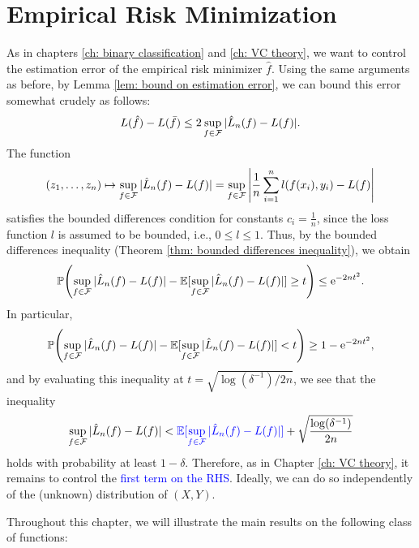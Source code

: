 \section{Empirical Risk Minimization}
\label{subsec: empirical risk minimization for general loss function}

As in chapters \ref{ch: binary classification} and \ref{ch: VC theory}, we want to control the estimation error of the empirical risk minimizer $\hat{f}$. Using the same arguments as before, by Lemma \ref{lem: bound on estimation error}, we can bound this error somewhat crudely as follows:
\[
    L(\hat{f}) - L(\bar{f}) \leq 2 \sup_{f \in \mathcal{F}} \abs*{\hat{L}_n(f) - L(f)}.
\]
The function
\[
    (z_1, \dots, z_n) \mapsto \sup_{f \in \mathcal{F}} \abs*{\hat{L}_n(f) - L(f)} = \sup_{f \in \mathcal{F}} \abs{\frac{1}{n} \sum_{i=1}^n l(f(x_i), y_i) - L(f)}
\]
satisfies the bounded differences condition for constants $c_i = \frac{1}{n}$, since the loss function $l$ is assumed to be bounded, i.e., $0 \leq l \leq 1$. Thus, by the bounded differences inequality (Theorem \ref{thm: bounded differences inequality}), we obtain
\[
    \Prob\left(\sup_{f \in \mathcal{F}} \abs*{\hat{L}_n(f) - L(f)} - \Exp[\sup_{f \in \mathcal{F}} \abs*{\hat L_n(f) - L(f)}] \geq t\right) \leq \e^{-2nt^2}.
\]
In particular,
\[
    \Prob\left(\sup_{f \in \mathcal{F}} \abs*{\hat{L}_n(f) - L(f)} - \Exp[\sup_{f \in \mathcal{F}} \abs*{\hat{L}_n(f) - L(f)}] < t\right) \geq 1 - \e^{-2nt^2},
\]
and by evaluating this inequality at $t = \sqrt{\log(\delta^{-1}) / 2n}$, we see that the inequality
\[
    \sup_{f \in \mathcal{F}} \abs*{\hat{L}_n(f) - L(f)} < {\color{blue} \Exp[\sup_{f \in \mathcal{F}} \abs*{\hat L_n(f) - L(f)}]} + \sqrt{\frac{\log(\delta^{-1})}{2n}}
\]
holds with probability at least $1 - \delta$. Therefore, as in Chapter \ref{ch: VC theory}, it remains to control the \textcolor{blue}{first term on the RHS}. Ideally, we can do so independently of the (unknown) distribution of $(X, Y)$.

Throughout this chapter, we will illustrate the main results on the following class of functions:


